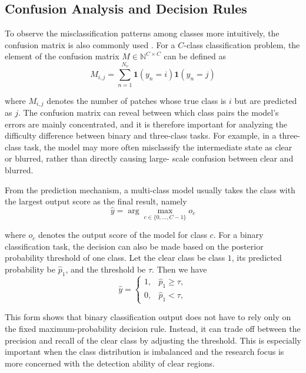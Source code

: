 \subsection{Confusion Analysis and Decision Rules}
\par To observe the misclassification patterns among classes more intuitively,
the confusion matrix is also commonly used \cite{schutze2008introduction}. For
a $C$-class classification problem, the element of the confusion matrix
$M\in\mathbb{N}^{C\times C}$ can be defined as
\begin{equation}
    M_{i,j}=
    \sum_{n=1}^{N_v}\mathbf{1}(y_n=i)\mathbf{1}(\hat{y}_n=j)
    \label{eq:confusion-basic}
\end{equation}
\par where $M_{i,j}$ denotes the number of patches whose true class is $i$ but
are predicted as $j$. The confusion matrix can reveal between which class
pairs the model's errors are mainly concentrated, and it is therefore important
for analyzing the difficulty difference between binary and three-class tasks.
For example, in a three-class task, the model may more often misclassify the
intermediate state as clear or blurred, rather than directly causing large-
scale confusion between clear and blurred.

\par From the prediction mechanism, a multi-class model usually takes the class
with the largest output score as the final result, namely
\begin{equation}
    \hat{y}=\arg\max_{c\in\{0,\dots,C-1\}} o_c
    \label{eq:argmax-basic}
\end{equation}
\par where $o_c$ denotes the output score of the model for class $c$. For a
binary classification task, the decision can also be made based on the
posterior probability threshold of one class. Let the clear class be class $1$,
its predicted probability be $\hat{p}_1$, and the threshold be $\tau$. Then
we have
\begin{equation}
    \hat{y}=
    \begin{cases}
        1, & \hat{p}_1\ge \tau, \\
        0, & \hat{p}_1<\tau,
    \end{cases}
    \label{eq:binary-threshold-basic}
\end{equation}
\par This form shows that binary classification output does not have to rely
only on the fixed maximum-probability decision rule. Instead, it can trade off
between the precision and recall of the clear class by adjusting the threshold.
This is especially important when the class distribution is imbalanced and the
research focus is more concerned with the detection ability of clear regions.

